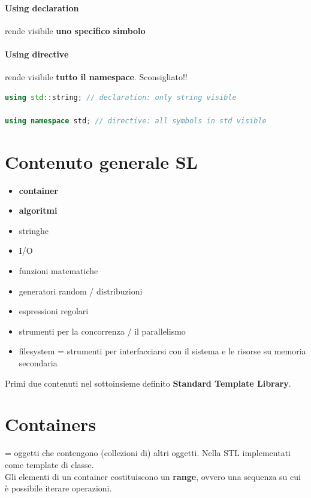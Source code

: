 \documentclass[10pt, oneside]{book}
\begin{document}
\paragraph{Using declaration} rende visibile \textbf{uno specifico simbolo}

\paragraph{Using directive} rende visibile \textbf{tutto il namespace}. Sconsigliato!!

\begin{lstlisting}[language=C++]
using std::string; // declaration: only string visible

using namespace std; // directive: all symbols in std visible
\end{lstlisting}

\section{Contenuto generale SL}
\begin{itemize}
\item \textbf{container}
\item \textbf{algoritmi}
\item stringhe
\item I/O
\item funzioni matematiche
\item generatori random / distribuzioni
\item espressioni regolari
\item strumenti per la concorrenza / il parallelismo
\item filesystem = strumenti per interfacciarsi con il sistema e le risorse su memoria secondaria
\end{itemize}
Primi due contenuti nel sottoinsieme definito \textbf{Standard Template Library}.

\section{Containers}
= oggetti che contengono (collezioni di) altri oggetti. Nella STL implementati come template di classe.\\
Gli elementi di un container costituiscono un \textbf{range}, ovvero una sequenza su cui è possibile iterare operazioni. 
\end{document}
